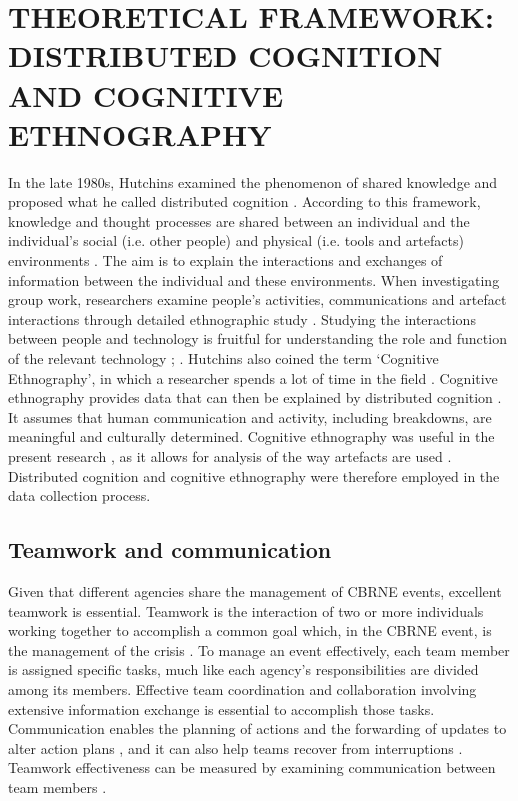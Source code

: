 \documentclass[link]{IWCOMP}
\begin{document}
\section{THEORETICAL FRAMEWORK: DISTRIBUTED COGNITION AND COGNITIVE ETHNOGRAPHY}\label{sec2}

In the late 1980s, Hutchins examined the phenomenon of shared knowledge and
proposed what he called distributed cognition \citep{bib13}. According to
this framework, knowledge and thought processes are shared between an
individual and the individual's social (i.e. other people) and physical
(i.e. tools and artefacts) environments \citep{bib10}. The aim is to
explain the interactions and exchanges of information between the individual
and these environments. When investigating group work, researchers examine
people's activities, communications and artefact interactions through
detailed ethnographic study \citep{bib32}. Studying the interactions
between people and technology is fruitful for understanding the role and
function of the relevant technology \citep{bib33}; \citep{bib15}.
Hutchins also coined the term `Cognitive Ethnography', in which a
researcher spends a lot of time in the field \citep{bib19}. Cognitive
ethnography provides data that can then be explained by distributed
cognition \citep{bib10}. It assumes that human communication and
activity, including breakdowns, are meaningful and culturally determined.
Cognitive ethnography was useful in the present research \citep{bib6}, as
it allows for analysis of the way artefacts are used \citep{bib40}.
Distributed cognition and cognitive ethnography were therefore employed in
the data collection process.

\subsection{Teamwork and communication}\label{subsec2.1}

Given that different agencies share the management of CBRNE events,
excellent teamwork is essential. Teamwork is the interaction of two or more
individuals working together to accomplish a common goal \citep{bib16}
which, in the CBRNE event, is the management of the crisis
\citep{bib26}. To manage an event effectively, each team member
is assigned specific tasks, much like each agency's responsibilities are
divided among its members. Effective team coordination and collaboration
\citep{bib30} involving extensive information exchange \citep{bib25}
is essential to accomplish those tasks. Communication
enables the planning of actions and the forwarding of updates to alter
action plans \citep{bib9}, and it can also help teams recover
from interruptions \citep{bib27}. Teamwork effectiveness can be measured
by examining communication between team members \citep{bib3}.
\end{document}
